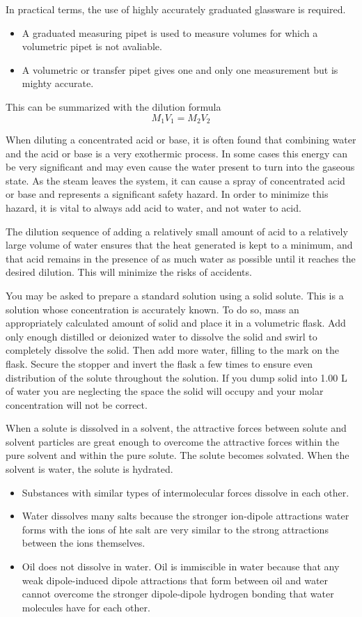 \documentclass[../chem.tex]{subfiles}
\begin{document}
In practical terms, the use of highly accurately graduated glassware is required.
\begin{itemize}
    \item A graduated measuring pipet is used to measure volumes for which a volumetric pipet is not avaliable.
    \item A volumetric or transfer pipet gives one and only one measurement but is mighty accurate.
\end{itemize}

This can be summarized with the dilution formula 
\[M_1V_1=M_2V_2\]

When diluting a concentrated acid or base, it is often found that combining water and the acid or base is a very exothermic process. In some 
cases this energy can be very significant and may even cause the water present to turn into the gaseous state. As the steam leaves the system, 
it can cause a spray of concentrated acid or base and represents a significant safety hazard. In order to minimize this hazard, it is vital to always 
add acid to water, and not water to acid.

The dilution sequence of adding a relatively small amount of acid to a relatively large volume of water ensures that the heat generated is kept to a minimum,
and that acid remains in the presence of as much water as possible until it reaches the desired dilution. This will minimize the risks of accidents.

You may be asked to prepare a standard solution using a solid solute. This is a solution whose concentration is accurately known. To do so, mass an appropriately calculated 
amount of solid and place it in a volumetric flask. Add only enough distilled or deionized water to dissolve the solid and swirl to completely 
dissolve the solid. Then add more water, filling to the mark on the flask. Secure the stopper and invert the flask a few times to ensure 
even distribution of the solute throughout the solution. If you dump solid into 1.00 L of water you are neglecting the space the solid will occupy and your molar concentration will not be correct.

When a solute is dissolved in a solvent, the attractive forces between solute and solvent particles are great enough to overcome the attractive forces within the 
pure solvent and within the pure solute. The solute becomes solvated. When the solvent is water, the solute is hydrated.

\begin{itemize}
    \item Substances with similar types of intermolecular forces dissolve in each other.
    \item Water dissolves many salts because the stronger ion-dipole attractions water forms with the ions of hte salt are very similar to the strong attractions between the ions themselves.
    \item Oil does not dissolve in water. Oil is immiscible in water because that any weak dipole-induced dipole attractions that form between oil and water cannot overcome the stronger dipole-dipole hydrogen bonding that water molecules have for each other.
\end{itemize}
\end{document}
